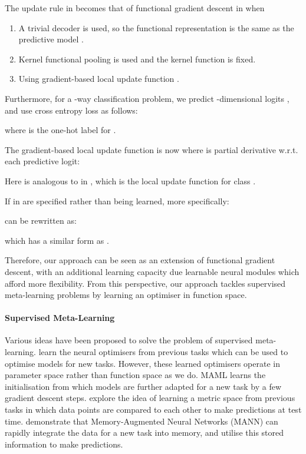 \documentclass{article}
\theoremstyle{definition}
\begin{document}
The update rule in  becomes that of functional gradient descent in  when 
\begin{enumerate}[label={\upshape(\roman*)}]
    \item A trivial decoder  is used, so the functional representation  is the same as the predictive model .
    \item Kernel functional pooling  is used and the kernel function is fixed.
    \item Using gradient-based local update function .
\end{enumerate}

Furthermore, for a -way classification problem, we predict -dimensional logits , and use cross entropy loss as follows:

where  is the one-hot label for .

The gradient-based local update function is now  where  is partial derivative w.r.t. each predictive logit:

Here  is analogous to  in , which is the local update function for class . 

If  in  are specified rather than being learned, more specifically:

 can be rewritten as:

which has a similar form as .




Therefore, our approach can be seen as an extension of functional gradient descent, with an additional learning capacity due learnable neural modules which afford more flexibility. From this perspective, our approach tackles supervised meta-learning problems by learning an optimiser in function space.

\paragraph{Supervised Meta-Learning} Various ideas have been proposed to solve the problem of supervised meta-learning. \citet{andrychowicz2016learning,ravi2016optimization} learn the neural optimisers from previous tasks which can be used to optimise models for new tasks. However, these learned optimisers operate in parameter space rather than function space as we do.
\gls{MAML} \citep{finn2017model} learns the initialisation from which models are further adapted for a new task by a few gradient descent steps.
\citet{koch2015siamese,snell2017prototypical,vinyals2016matching} explore the idea of learning a metric space from previous tasks in which data points are compared to each other to make predictions at test time.
\citet{santoro2016meta} demonstrate that Memory-Augmented Neural Networks (MANN) can rapidly integrate the data for a new task into memory, and utilise this stored information to make predictions.
\end{document}
